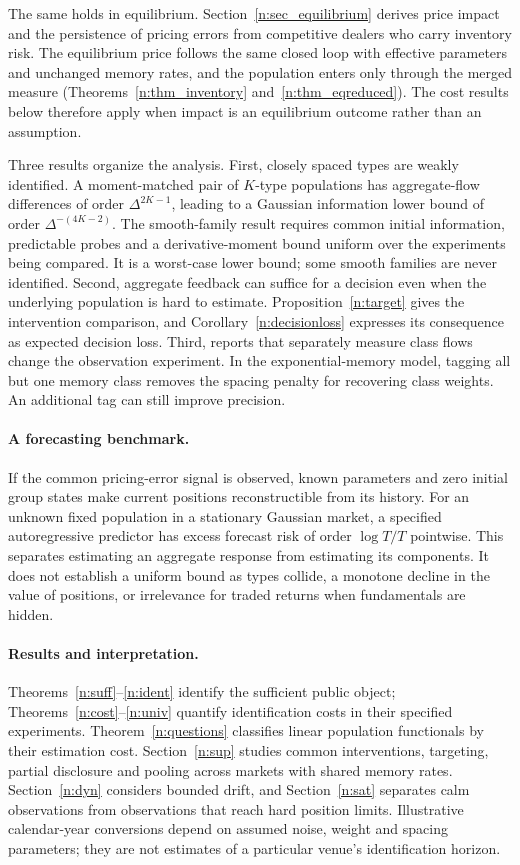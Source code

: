 The same holds in equilibrium. Section~\ref{n:sec_equilibrium} derives price impact and the persistence of pricing errors from competitive dealers who carry inventory risk. The equilibrium price follows the same closed loop with effective parameters and unchanged memory rates, and the population enters only through the merged measure (Theorems~\ref{n:thm_inventory} and~\ref{n:thm_eqreduced}). The cost results below therefore apply when impact is an equilibrium outcome rather than an assumption.

    Three results organize the analysis. First, closely spaced types are weakly identified. A moment-matched pair of $K$-type populations has aggregate-flow differences of order $\Delta^{2K-1}$, leading to a Gaussian information lower bound of order $\Delta^{-(4K-2)}$. The smooth-family result requires common initial information, predictable probes and a derivative-moment bound uniform over the experiments being compared. It is a worst-case lower bound; some smooth families are never identified. Second, aggregate feedback can suffice for a decision even when the underlying population is hard to estimate. Proposition~\ref{n:target} gives the intervention comparison, and Corollary~\ref{n:decisionloss} expresses its consequence as expected decision loss. Third, reports that separately measure class flows change the observation experiment. In the exponential-memory model, tagging all but one memory class removes the spacing penalty for recovering class weights. An additional tag can still improve precision.

\paragraph{A forecasting benchmark.} If the common pricing-error signal is observed, known parameters and zero initial group states make current positions reconstructible from its history. For an unknown fixed population in a stationary Gaussian market, a specified autoregressive predictor has excess forecast risk of order $\log T/T$ pointwise. This separates estimating an aggregate response from estimating its components. It does not establish a uniform bound as types collide, a monotone decline in the value of positions, or irrelevance for traded returns when fundamentals are hidden.

\paragraph{Results and interpretation.} Theorems~\ref{n:suff}--\ref{n:ident} identify the sufficient public object; Theorems~\ref{n:cost}--\ref{n:univ} quantify identification costs in their specified experiments. Theorem~\ref{n:questions} classifies linear population functionals by their estimation cost. Section~\ref{n:sup} studies common interventions, targeting, partial disclosure and pooling across markets with shared memory rates. Section~\ref{n:dyn} considers bounded drift, and Section~\ref{n:sat} separates calm observations from observations that reach hard position limits. Illustrative calendar-year conversions depend on assumed noise, weight and spacing parameters; they are not estimates of a particular venue's identification horizon.

